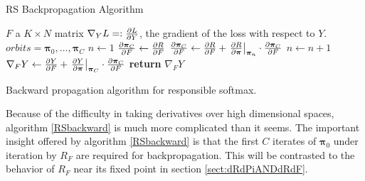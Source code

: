 \begin{table}
	
	\begin{algorithm}[H]
		\caption{RS Backpropagation Algorithm}\label{RSbackward}
		\begin{algorithmic}
			\Require $F$ a $K\times N$ matrix
			\Require $\nabla_Y L=:\pdv{L}{Y}$, the gradient of the loss with respect to \( Y \).
			\Require $orbits = {\bm\pi_0,\ldots,\bm\pi_{C}}$
			\State $n \gets 1$
			\State \( \pdv{\bm\pi_C}{F}\gets \pdv{R}{F} \)
				\State \( \pdv{\bm\pi_C}{F} \gets \pdv{R}{F} + \eval{\pdv{R}{\bm\pi}}_{\bm\pi_n}\cdot\pdv{\bm\pi_C}{F}\)
				\State \( n \gets n+1 \)
			\EndWhile
			\State \( \nabla_F Y \gets \pdv{Y}{F} + \eval{\pdv{Y}{\bm\pi}}_{\bm\pi_C}\cdot\pdv{\bm\pi_C}{F} \)
			\State \textbf{return} $\nabla_F Y$ %
			\EndProcedure
		\end{algorithmic}
	\end{algorithm}
	\caption{Backward propagation algorithm for responsible softmax.}
\end{table}


Because of the difficulty in taking derivatives over high dimensional spaces, algorithm \ref{RSbackward} is much more complicated than it seems.  The important insight offered by algorithm \ref{RSbackward} is that the first \( C \) iterates of \( \bm\pi_0 \) under iteration by \( R_F \) are required for backpropagation. This will be contrasted to the behavior of \( R_F \) near its fixed point in section \ref{sect:dRdPiANDdRdF}.

%
